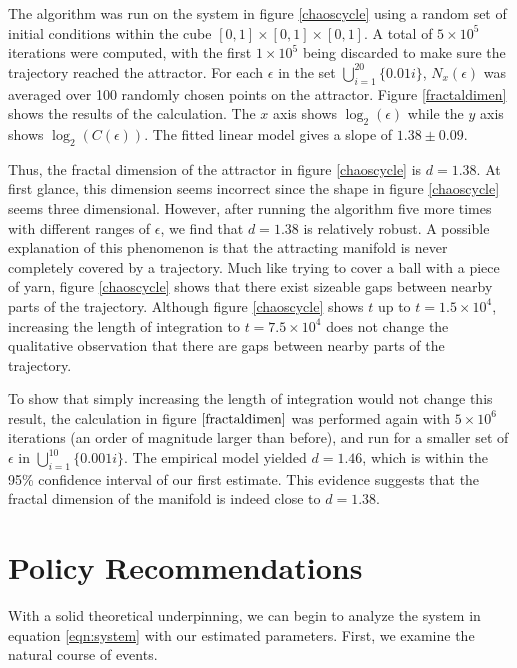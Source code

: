 \documentclass[12pt,journal,compsoc,twoside]{IEEEtran}
\begin{document}
The algorithm was run on the system in figure \ref{chaoscycle} using a random set of initial conditions within the cube $[0,1] \times [0,1] \times [0,1]$. A total of $5 \times 10^{5}$ iterations were computed, with the first $1 \times 10^{5}$ being discarded to make sure the trajectory reached the attractor. For each $\epsilon$ in the set $\bigcup_{i = 1}^{20} \{0.01 i \}$, $N_x(\epsilon)$ was averaged over 100 randomly chosen points on the attractor.  Figure \ref{fractaldimen} shows the results of the calculation. The $x$ axis shows $\log_2(\epsilon)$ while the $y$ axis shows $\log_2(C(\epsilon))$. The fitted linear model gives a slope of $1.38 \pm 0.09$.  

Thus, the fractal dimension of the attractor in figure \ref{chaoscycle} is $d = 1.38$. At first glance, this dimension seems incorrect since the shape in figure \ref{chaoscycle} seems three dimensional. However, after running the algorithm five more times with different ranges of $\epsilon$, we find that $d = 1.38$ is relatively robust. A possible explanation of this phenomenon is that the attracting manifold is never completely covered by a trajectory. Much like trying to cover a ball with a piece of yarn, figure \ref{chaoscycle} shows that there exist sizeable gaps between nearby parts of the trajectory. Although figure \ref{chaoscycle} shows $t$ up to $t = 1.5 \times 10^{4}$, increasing the length of integration to $t = 7.5 \times 10^{4}$ does not change the qualitative observation that there are gaps between nearby parts of the trajectory.   

To show that simply increasing the length of integration would not change this result, the calculation in figure $\ref{fractaldimen}$ was performed again with $5 \times 10^{6}$ iterations (an order of magnitude larger than before), and run for a smaller set of $\epsilon$ in $\bigcup_{i=1}^{10} \{ 0.001i \}$. The empirical model yielded $d = 1.46$, which is within the 95\% confidence interval of our first estimate. This evidence suggests that the fractal dimension of the manifold is indeed close to $d = 1.38$. 

\section{Policy Recommendations}

With a solid theoretical underpinning, we can begin to analyze the system in equation \ref{eqn:system} with our estimated parameters. First, we examine the natural course of events.
\end{document}
